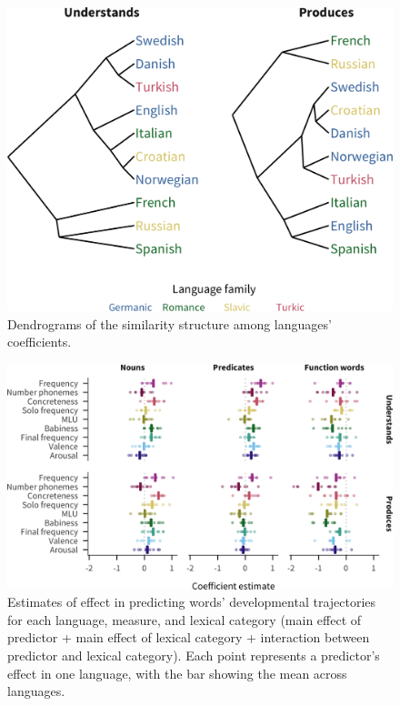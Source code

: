 \documentclass[manuscript]{stjour}
\begin{document}
\begin{figure}

{\centering \includegraphics[width=0.7\linewidth]{clustering-1}

}

\caption{Dendrograms of the similarity structure among languages' coefficients.}\label{fig:clustering}
\end{figure}

\begin{figure}

{\centering \includegraphics[width=\textwidth]{lexcatcoefs-1}

}

\caption{Estimates of effect in predicting words' developmental trajectories for each language, measure, and lexical category (main effect of predictor + main effect of lexical category + interaction between predictor and lexical category). Each point represents a predictor's effect in one language, with the bar showing the mean across languages.}\label{fig:lexcatcoefs}
\end{figure}
\end{document}

